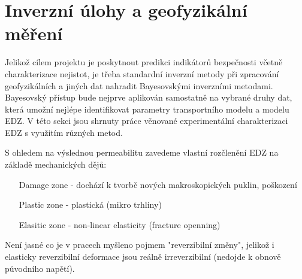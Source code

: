 \documentclass{article}
\begin{document}
% 
% 
% 
% 
% 
% 
% 
% 


\section{Inverzní úlohy a geofyzikální měření}


Jelikož cílem projektu je poskytnout predikci indikátorů bezpečnosti 
včetně charakterizace nejistot, je třeba standardní inverzní metody při zpracování geofyzikálních a jiných dat nahradit Bayesovskými inverzními metodami. Bayesovský přístup bude nejprve aplikován samostatně na vybrané druhy dat, která umožní nejlépe identifikovat parametry transportního modelu a modelu EDZ. V této sekci jsou shrnuty práce věnované experimentální charakterizaci EDZ s využitím různých metod.

S ohledem na výslednou permeabilitu zavedeme vlastní rozčlenění EDZ na základě mechanických dějů:
\begin{itemize}
    \item [Damage zone] - dochází k tvorbě nových makroskopických puklin, poškození
    \item [Plastic zone] - plastická (mikro trhliny)
    \item [Elasitic zone] - non-linear elasticity (fracture openning)
\end{itemize}
Není jasné co je v pracech myšleno pojmem "reverzibilní změny", jelikož i elasticky reverzibilní deformace jsou reálně irreverzibilní (nedojde k obnově původního napětí).
\end{document}

